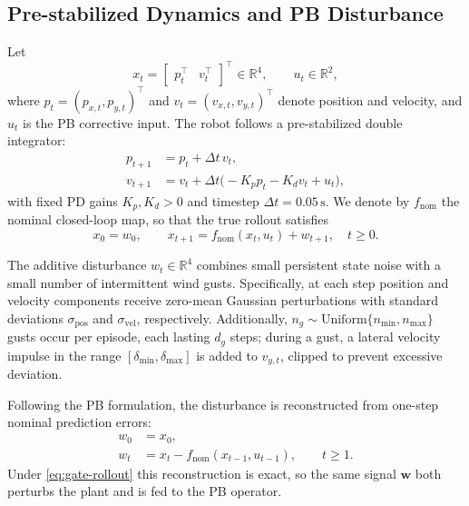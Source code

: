 \documentclass[journal,twoside,web]{ieeecolor}
\begin{document}
\subsection{Pre-stabilized Dynamics and PB Disturbance}
\label{subsec:gate-dynamics}

Let
\begin{equation}
x_t=
\begin{bmatrix}
p_t^\top & v_t^\top
\end{bmatrix}^\top
\in\mathbb{R}^4,
\qquad
u_t\in\mathbb{R}^2,
\end{equation}
where \(p_t=(p_{x,t},p_{y,t})^\top\) and \(v_t=(v_{x,t},v_{y,t})^\top\) denote position and
velocity, and \(u_t\) is the PB corrective input. The robot follows a pre-stabilized double integrator:
\begin{align}
p_{t+1} &= p_t + \Delta t\, v_t, \label{eq:gate-nom-p}\\
v_{t+1} &= v_t + \Delta t\big(-K_p p_t - K_d v_t + u_t\big),
\label{eq:gate-nom-v}
\end{align}
with fixed PD gains \(K_p,K_d>0\) and timestep \(\Delta t=0.05\,\mathrm{s}\). We denote by
\(f_{\mathrm{nom}}\) the nominal closed-loop map, so that the true rollout satisfies
\begin{equation}
x_0 = w_0,
\qquad
x_{t+1}=f_{\mathrm{nom}}(x_t,u_t)+w_{t+1},
\quad t\ge 0.
\label{eq:gate-rollout}
\end{equation}

The additive disturbance \(w_t\in\mathbb{R}^4\) combines small persistent state noise with a
small number of intermittent wind gusts. Specifically, at each step position and velocity
components receive zero-mean Gaussian perturbations with standard deviations
\(\sigma_{\mathrm{pos}}\) and \(\sigma_{\mathrm{vel}}\), respectively. Additionally,
\(n_g\sim\mathrm{Uniform}\{n_{\min},n_{\max}\}\) gusts occur per episode, each lasting
\(d_g\) steps; during a gust, a lateral velocity impulse in the range
\([\delta_{\min},\delta_{\max}]\) is added to \(v_{y,t}\), clipped to prevent excessive
deviation.

Following the PB formulation, the disturbance is reconstructed from one-step nominal prediction errors:
\begin{align}
w_0 &= x_0, \label{eq:gate-w0}\\
w_t &= x_t-f_{\mathrm{nom}}(x_{t-1},u_{t-1}),
\qquad t\ge 1.
\label{eq:gate-wt}
\end{align}
Under \eqref{eq:gate-rollout} this reconstruction is exact, so the same signal \(\mathbf{w}\) both
perturbs the plant and is fed to the PB operator.
\end{document}
